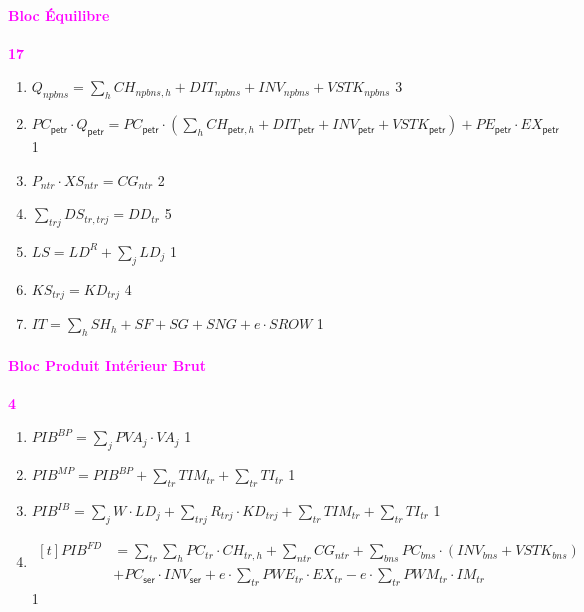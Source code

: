 \documentclass[11pt,a4paper]{article}
\newcommand{\trj}{\mathit{trj}}
\newcommand{\npbns}{\mathit{npbns}}
\newcommand{\bns}{\mathit{bns}}
\newcommand{\CG}{\mathit{CG}}
\newcommand{\CH}{\mathit{CH}}
\newcommand{\DD}{\mathit{DD}}
\newcommand{\DIT}{\mathit{DIT}}
\newcommand{\DS}{\mathit{DS}}
\newcommand{\EX}{\mathit{EX}}
\newcommand{\IM}{\mathit{IM}}
\newcommand{\INV}{\mathit{INV}}
\newcommand{\IT}{\mathit{IT}}
\newcommand{\KD}{\mathit{KD}}
\newcommand{\KS}{\mathit{KS}}
\newcommand{\LD}{\mathit{LD}}
\newcommand{\LS}{\mathit{LS}}
\newcommand{\ntr}{\mathit{ntr}}
\newcommand{\ser}{\mathsf{ser}}
\newcommand{\SNG}{\mathit{SNG}}
\newcommand{\SF}{\mathit{SF}}
\newcommand{\SG}{\mathit{SG}}
\newcommand{\SH}{\mathit{SH}}
\newcommand{\TI}{\mathit{TI}}
\newcommand{\TIM}{\mathit{TIM}}
\newcommand{\PE}{\mathit{PE}}
\newcommand{\PC}{\mathit{PC}}
\newcommand{\PWE}{\mathit{PWE}}
\newcommand{\PWM}{\mathit{PWM}}
\newcommand{\PVA}{\mathit{PVA}}
\newcommand{\petr}{\mathsf{petr}}
\newcommand{\tr}{\mathit{tr}}
\newcommand{\VA}{\mathit{VA}}
\newcommand{\VSTK}{\mathit{VSTK}}
\newcommand{\XS}{\mathit{XS}}
\newcommand{\SROW}{\mathit{SROW}}
\newcommand{\redparagraph}[1]{\paragraph*{\large\textcolor{Fuchsia}{#1}}}
\newcommand{\PIB}{\mathit{PIB}}
\begin{document}
	\redparagraph{Bloc Équilibre}\hfill \textcolor{Fuchsia}{\textbf{17}} 
	\begin{enumerate}[itemsep=2pt,label=\textbf{eq\arabic*}.,resume,  ref=\textbf{eq\arabic*}]
		
		\item $Q_{\npbns} = \sum_{h} \CH_{\npbns,h} + \DIT_{\npbns} + \INV_{\npbns} +  \VSTK_{\npbns}$  \label{it:Qpetr}\hfill 3
		
		\item $ \PC_{\petr}\cdot Q_{\petr} = \PC_{\petr}\cdot\left(\sum_{h} \CH_{\petr,h} + \DIT_{\petr}  + \INV_{\petr} + \VSTK_{\petr}\right) + \PE_{\petr}\cdot\EX_{\petr}$  \label{it:QDpetr}\hfill 1
		
		
		
		\item $P_{\ntr}\cdot \XS_{\ntr} = \CG_{\ntr}$ \hfill 2
		
		\item $\sum_{\trj}\DS_{\tr,\trj} = \DD_{\tr}$ \hfill 5
		
		\item $\LS = \LD^R+\sum_{j}\LD_j$ \label{it:LS}\hfill 1
		
		\item $\KS_{\trj} = \KD_{\trj}$ \label{it:KS}\hfill 4
		
		\item $\IT  = \sum_{h}\SH_h + \SF + \SG + \SNG + e\cdot\SROW $  \label{it:IT}\hfill 1
		
	\end{enumerate}
	
	\redparagraph{Bloc Produit Intérieur Brut}\hfill \textcolor{Fuchsia}{\textbf{4}} 
	\begin{enumerate}[itemsep=2pt,label=\textbf{eq\arabic*}.,resume,  ref=\textbf{eq\arabic*}]
		
		\item $ \PIB^{\mathit{\mathit{BP}}} = \sum_{j} \PVA_{j}\cdot\VA_{j}$ \hfill 1 
		
		\item $ \PIB^{\mathit{MP}} =  \PIB^{\mathit{BP}} + \sum_{\tr} 	\TIM_{\tr} +\sum_{\tr} \TI_{\tr}$ \hfill 1 
		
		\item $ \PIB^{\mathit{IB}} =  \sum_{j} W\cdot\LD_{j} + \sum_{\trj} R_{\trj}\cdot\KD_{\trj} + \sum_{\tr} \TIM_{\tr} +\sum_{\tr} \TI_{\tr}$ \hfill 1 
		
		\item $\begin{aligned}[t]
			\PIB^{\mathit{FD}} &=  \sum_{\tr}\sum_{h} \PC_{\tr}\cdot\CH_{\tr,h} + \sum_{\ntr} \CG_{\ntr} +  \sum_{\bns}\PC_{\bns}\cdot\left(\INV_{\bns} + \VSTK_{\bns}\right)  \\
			&+ \PC_{\ser}\cdot\INV_{\ser} +   e\cdot\sum_{\tr}^{} \PWE_{\tr}\cdot\EX_{\tr} - e\cdot \sum_{\tr}^{} \PWM_{\tr}\cdot\IM_{\tr}
		\end{aligned}$   \hfill 1
		
	\end{enumerate}
	
\end{document}
